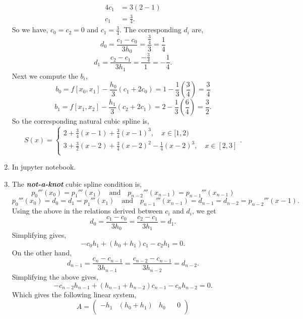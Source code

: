\documentclass{report}
\begin{document}
\begin{solution}
\begin{enumerate}[label=(\alph*)]
\begin{align*}
			      4c_1                                             & =   3(2-1) \\
			      c_1                                              & =   \frac{3}{4}
			      .\end{align*}
		      So we have, $c_0 =c_2 =0$ and $c_1=\frac{3}{4}$.
		      The corresponding $d_i$ are,
		      \[
			      d_0 = \frac{c_1-c_0}{3h_{0}} = \frac{\frac{3}{4}}{3} = \frac{1}{4}
		      \]
		      \[
			      d_1 = \frac{c_2-c_1}{3h_{1}} = \frac{-\frac{3}{4}}{1} = -\frac{1}{4}
			      .\]
		      Next we compute the $b_{i}$,
		      \[
			      b_{0} = f[x_{0},x_1] - \frac{h_{0}}{3} \left( c_1+2c_0 \right) = 1- \frac{1}{3} \left(\frac{3}{4}  \right) =\frac{3}{4}
		      \]
		      \[
			      b_{1} = f[x_{1},x_2] - \frac{h_{1}}{3} \left( c_2+2c_1 \right) = 2- \frac{1}{3} \left(\frac{6}{4}  \right) =\frac{3}{2}
			      .    \]
		      So the corresponding natural cubic spline is,
		      \[
			      S(x)=  \begin{cases}
				      2+\frac{3}{4}(x-1) + \frac{3}{4}(x-1)^3 , \quad x\in[1,2)                 \\
				      3+\frac{3}{2}(x-2)+\frac{3}{4}(x-2)^2-\frac{1}{4}(x-2)^3, \quad x\in[2,3] \\
			      \end{cases}
			      .\]
		\item In jupyter notebook.
		\item The \emph{\bfseries not-a-knot} cubic spline condition is,
		      \[
			      p_0'''(x_0) = p_1'''(x_1) \quad \text{and} \quad p_{n-2}'''(x_{n-1}) = p_{n-1}'''(x_{n-1})
		      \]
		      \[
			      p_0'''(x_0) = d_0 = d_1 = p_1'''(x_1) \quad \text{and} \quad p_{n-1}'''(x_{n-1}) = d_{n-1} = d_{n-2} = p_{n-2}''' (x-1)
			      . \]
		      Using the above in the relations derived between $c_{i}$ and $d_{i}$, we get
		      \[
			      d_0 = \frac{c_1-c_0}{3h_{0}} = \frac{c_{2}-c_{1}}{3h_{1}} = d_{1}
			      .\]
		      Simplifying gives,
		      \[
			      -c_{0}h_1 + (h_0+h_1)c_{1} -c_{2}h_{1} = 0
			      .\]
		      On the other hand,
		      \[
			      d_{n-1} = \frac{c_{n} - c_{n-1}}{3h_{n-1}} = \frac{c_{n-2}-c_{n-1}}{3h_{n-2}} = d_{n-2}
			      .\]
		      Simplifying the above gives,
		      \[
			      -c_{n-2}h_{n-1} + (h_{n-1}+h_{n-2})c_{n-1} -c_{n}h_{n-2} = 0
			      .\]
		      Which gives the following linear system,
		      \[
			      A = \begin{pmatrix}
				      -h_1 & (h_0+h_1) & h_0      &                     & 0       \\

\end{pmatrix}\]
\end{enumerate}
\end{solution}
\end{document}
